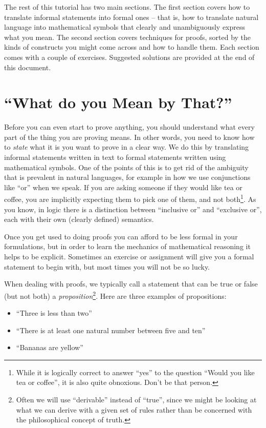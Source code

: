 \documentclass{tufte-handout}
\newcounter{example}
\newcounter{exc:first:proof}
\begin{document}
The rest of this tutorial has two main sections.
%
The first section covers how to translate informal statements into
formal ones -- that is, how to translate natural language into
mathematical symbols that clearly and unambiguously express what
you mean.
%
The second section covers techniques for proofs, sorted by the
kinds of constructs you might come across and how to handle them.
%
%
Each section comes with a couple of exercises. Suggested solutions
are provided at the end of this document.

\section{``What do you Mean by That?''}

Before you can even start to prove anything, you should understand
what every part of the thing you are proving means. In other
words, you need to know how to \emph{state} what it is you want to
prove in a clear way. We do this by translating informal
statements written in text to formal statements written using
mathematical symbols.
%
One of the points of this is to get rid of the ambiguity that is
prevalent in natural languages, for example in how we use
conjunctions like ``or'' when we speak. If you are asking someone
if they would like tea or coffee, you are implicitly expecting
them to pick one of them, and not both\footnote{While it is
  logically correct to answer ``yes'' to the question ``Would you
  like tea or coffee'', it is also quite obnoxious. Don't be that
  person. }. As you know, in logic there is a distinction between
``inclusive or'' and ``exclusive or'', each with their own
(clearly defined) semantics.

Once you get used to doing proofs you can afford to be less formal
in your formulations, but in order to learn the mechanics of
mathematical reasoning it helps to be explicit.
%
Sometimes an exercise or assignment will give you a formal
statement to begin with, but most times you will not be so lucky.

When dealing with proofs, we typically call a statement that can
be true or false (but not both) a
\emph{proposition}\footnote{Often we will use ``derivable''
  instead of ``true'', since we might be looking at what we can
  derive with a given set of rules rather than be concerned with
  the philosophical concept of truth. }. Here are three examples
of propositions:
\begin{itemize}
\item ``Three is less than two''
\item ``There is at least one natural number between five
and ten''
\item ``Bananas are yellow''
\end{itemize}
\end{document}
